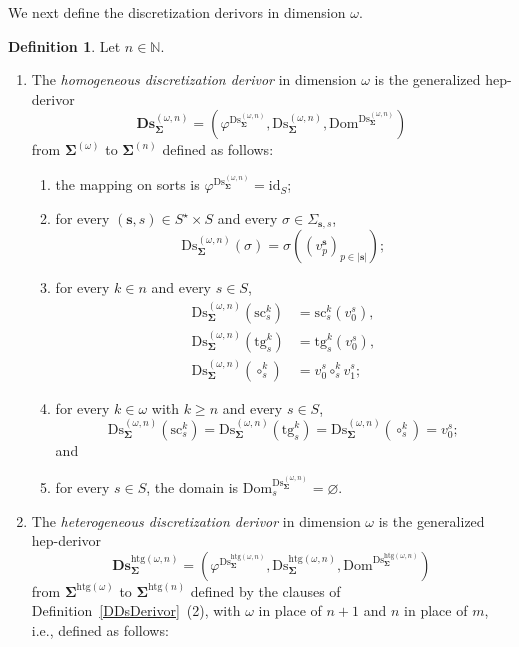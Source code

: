 \documentclass[a4paper, reqno]{amsbook}
\newcommand{\bb}[1]{\ensuremath{\lvert #1 \rvert}}
\newcommand{\sig}[1]{\mathbf{#1}}             %
\newcommand{\Dom}{\mathrm{Dom}}
\newcommand{\htg}{\mathrm{htg}}                %
\newcommand{\id}{\mathrm{id}}
\newcommand{\src}{\mathrm{sc}}
\newcommand{\tgt}{\mathrm{tg}}
\newcommand{\Ds}{\mathrm{Ds}}
\newcommand{\bDs}{\mathbf{Ds}}
\theoremstyle{plain}
\theoremstyle{definition}
\newtheorem{definition}[theorem]{Definition}
\begin{document}
We next define the discretization derivors in dimension $\omega$.

\begin{definition}\label{DDsDerivorOmega}
Let $n\in\mathbb{N}$.
\begin{enumerate}
\item The \emph{homogeneous discretization derivor} in dimension $\omega$ is the generalized hep-derivor
$$
\bDs^{(\omega,n)}_{\sig{\Sigma}}=\left(\varphi^{\Ds^{(\omega,n)}_{\sig{\Sigma}}},\Ds^{(\omega,n)}_{\sig{\Sigma}},\Dom^{\Ds^{(\omega,n)}_{\sig{\Sigma}}}\right)
$$
from $\sig{\Sigma}^{(\omega)}$ to $\sig{\Sigma}^{(n)}$ defined as follows:
\begin{enumerate}
\item the mapping on sorts is $\varphi^{\Ds^{(\omega,n)}_{\sig{\Sigma}}}=\id_{S}$;
\item for every $(\mathbf{s},s)\in S^{\star}\times S$ and every $\sigma\in\Sigma_{\mathbf{s},s}$,
$$
\Ds^{(\omega,n)}_{\sig{\Sigma}}(\sigma)=\sigma((v^{\mathbf{s}}_{p})_{p\in\bb{\mathbf{s}}});
$$
\item for every $k\in n$ and every $s\in S$,
\begin{align*}
\Ds^{(\omega,n)}_{\sig{\Sigma}}(\src^{k}_{s})&=\src^{k}_{s}(v^{s}_{0}),\\
\Ds^{(\omega,n)}_{\sig{\Sigma}}(\tgt^{k}_{s})&=\tgt^{k}_{s}(v^{s}_{0}),\\
\Ds^{(\omega,n)}_{\sig{\Sigma}}(\circ^{k}_{s})&=v^{s}_{0}\circ^{k}_{s}v^{s}_{1};
\end{align*}
\item for every $k\in\omega$ with $k\geq n$ and every $s\in S$,
$$
\Ds^{(\omega,n)}_{\sig{\Sigma}}(\src^{k}_{s})=\Ds^{(\omega,n)}_{\sig{\Sigma}}(\tgt^{k}_{s})=\Ds^{(\omega,n)}_{\sig{\Sigma}}(\circ^{k}_{s})=v^{s}_{0};
$$
and
\item for every $s\in S$, the domain is $\Dom^{\Ds^{(\omega,n)}_{\sig{\Sigma}}}_{s}=\varnothing$.
\end{enumerate}
\item The \emph{heterogeneous discretization derivor} in dimension $\omega$ is the generalized hep-derivor
$$
\bDs^{\htg(\omega,n)}_{\sig{\Sigma}}=\left(\varphi^{\Ds^{\htg(\omega,n)}_{\sig{\Sigma}}},\Ds^{\htg(\omega,n)}_{\sig{\Sigma}},\Dom^{\Ds^{\htg(\omega,n)}_{\sig{\Sigma}}}\right)
$$
from $\sig{\Sigma}^{\htg(\omega)}$ to $\sig{\Sigma}^{\htg(n)}$ defined by the clauses of Definition~\ref{DDsDerivor}~(2), with $\omega$ in place of $n+1$ and $n$ in place of $m$, i.e., defined as follows:
\begin{enumerate}

\end{enumerate}
\end{enumerate}
\end{definition}
\end{document}
